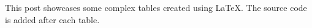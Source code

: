 This post showcases some complex tables created using LaTeX. The source code is added after each table.

\newline